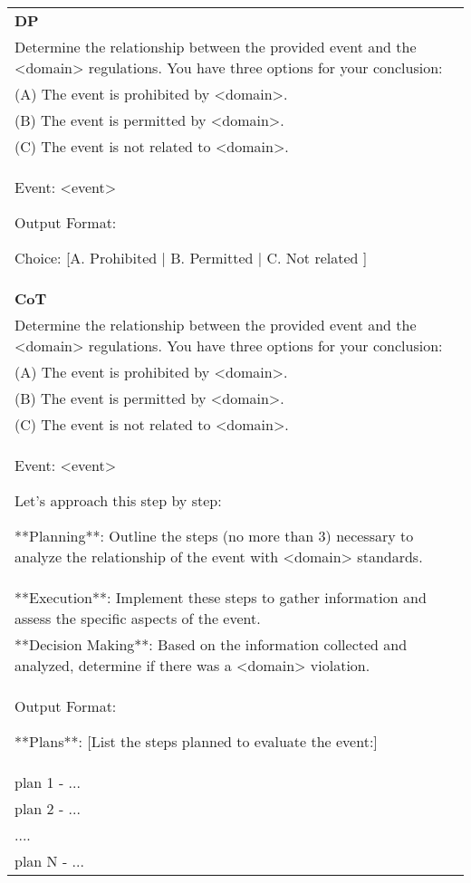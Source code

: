 
\begin{table*}[t!]

\small
\centering
\begin{tabular}{p{}}
\toprule

\textbf{DP}\\
    Determine the relationship between the provided event and the \textcolor{contentcolor}{<domain>} regulations. You have three options for your conclusion:\\
(A) The event is prohibited by \textcolor{contentcolor}{<domain>}.\\
(B) The event is permitted by \textcolor{contentcolor}{<domain>}.\\
(C) The event is not related to \textcolor{contentcolor}{<domain>}.\\

Event:
\textcolor{contentcolor}{<event>}

Output Format:

Choice: [A. Prohibited | B. Permitted | C. Not related ]
\\

\midrule
\textbf{CoT} \\
Determine the relationship between the provided event and the \textcolor{contentcolor}{<domain>} regulations. You have three options for your conclusion:\\
(A) The event is prohibited by \textcolor{contentcolor}{<domain>}.\\
(B) The event is permitted by \textcolor{contentcolor}{<domain>}.\\
(C) The event is not related to \textcolor{contentcolor}{<domain>}.\\

Event:
\textcolor{contentcolor}{<event>}

Let's approach this step by step:

**Planning**: Outline the steps (no more than 3) necessary to analyze the relationship of the event with \textcolor{contentcolor}{<domain>} standards.\\
**Execution**: Implement these steps to gather information and assess the specific aspects of the event.\\
**Decision Making**: Based on the information collected and analyzed, determine if there was a \textcolor{contentcolor}{<domain>} violation.\\
Output Format:

**Plans**: [List the steps planned to evaluate the event:]\\
plan 1 - ...\\
plan 2 - ...\\
....\\
plan N - ...\\


\end{tabular}
\end{table*}
